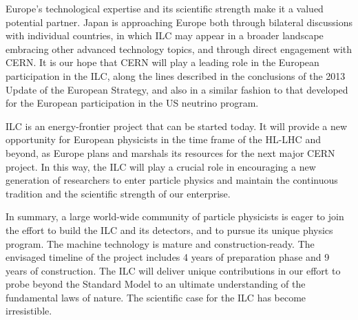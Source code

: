\documentclass[%
reprint,
 floatfix,
 amsmath,amssymb,
 aps,
]{revtex4-1}
\begin{document}
 Europe's technological expertise and its scientific strength make it
 a valued potential partner.   Japan is approaching Europe both
 through
bilateral discussions with individual countries, in which  ILC may
 appear in a broader landscape embracing other advanced technology
 topics, and through direct engagement with CERN. 
It is our hope  that CERN will play a leading
role in the European participation in the ILC, along the lines
described in the 
conclusions of the 2013 Update of the European Strategy, and also in a
similar fashion to that  developed for the European participation
in the US  neutrino program.  

ILC is an energy-frontier project that
can be started today.   It will provide a new opportunity for European
physicists in the time frame of the HL-LHC and beyond, as Europe plans
and marshals its resources for the next major CERN project. In this 
way, the ILC will play a crucial role in encouraging a new
generation of researchers to enter particle physics and maintain the
continuous tradition and the scientific strength of our enterprise.

In summary, a large world-wide community of particle physicists is eager to join the effort to build the ILC and its detectors, and to pursue its unique 
physics program. The machine technology is mature and construction-ready. The
envisaged timeline of the project includes 4 years of preparation
phase and 9 years of construction. The ILC will deliver unique contributions in our effort to probe beyond the Standard Model to an ultimate understanding
of the fundamental laws of nature. The scientific case for the ILC
has become irresistible.


\end{document}
